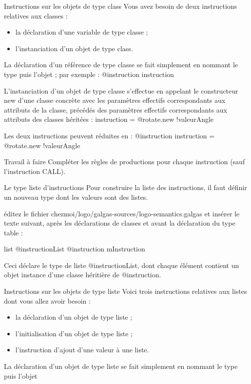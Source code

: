 Instructions sur les objets de type class
Vous avez besoin de deux instructions relatives aux classes :
\begin{itemize}
  \item la déclaration d'une variable de type classe ;
  \item l'instanciation d'un objet de type class.
\end{itemize}

La déclaration d'un référence de type classe se fait simplement en nommant le type puis l'objet ; par exemple :
	@instruction instruction

L'instanciation d'un objet de type classe s'effectue en appelant le constructeur new d'une classe concrète avec les paramètres effectifs correspondants aux attributs de la classe, précédés des paramètres effectifs correspondants aux attributs des classes héritées :
	instruction = @rotate.new {!valeurAngle}

Les deux instructions peuvent réduites en :
	@instruction instruction = @rotate.new {!valeurAngle}

Travail à faire
Compléter les règles de productions pour chaque instruction (sauf l'instruction CALL).

Le type liste d'instructions
Pour construire la liste des instructions, il faut définir un nouveau type dont les valeurs sont des listes.

éditez le fichier chezmoi/logo/galgas-sources/logo-semantics.galgas et insérer le texte suivant, après les déclarations de classes et avant la déclaration du type table :

\begin{galgascode}
list @instructionList {
  @instruction mInstruction
}
\end{galgascode}

Ceci déclare le type de liste @instructionList, dont chaque élément contient un objet instance d'une classe héritière de @instruction.

Instructions sur les objets de type liste
Voici trois instructions relatives aux listes dont vous allez avoir besoin :
\begin{itemize}
  \item la déclaration d'un objet de type liste ;
  \item l'initialisation d'un objet de type liste ;
  \item l'instruction d'ajout d'une valeur à une liste.
\end{itemize}

La déclaration d'un objet de type liste se fait simplement en nommant le type puis l'objet 

